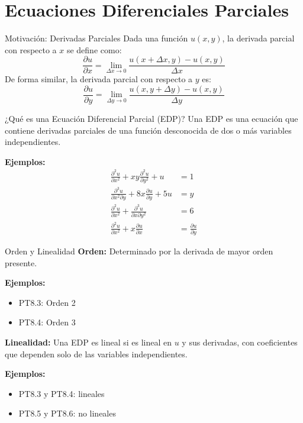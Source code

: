 \documentclass[main.tex]{subfiles}
\begin{document}
\section{Ecuaciones Diferenciales Parciales}

\begin{frame}{Motivación: Derivadas Parciales}
\small
Dada una función \( u(x, y) \), la derivada parcial con respecto a \( x \) se define como:
\[
\frac{\partial u}{\partial x} = \lim_{\Delta x \to 0} \frac{u(x + \Delta x, y) - u(x, y)}{\Delta x}
\]
De forma similar, la derivada parcial con respecto a \( y \) es:
\[
\frac{\partial u}{\partial y} = \lim_{\Delta y \to 0} \frac{u(x, y + \Delta y) - u(x, y)}{\Delta y}
\]
\end{frame}

\begin{frame}{¿Qué es una Ecuación Diferencial Parcial (EDP)?}
\small
Una EDP es una ecuación que contiene derivadas parciales de una función desconocida de dos o más variables independientes.

\textbf{Ejemplos:}
\begin{align*}
\frac{\partial^2 u}{\partial x^2} + x y \frac{\partial^2 u}{\partial y^2} + u &= 1 \\
\frac{\partial^3 u}{\partial x^2 \partial y} + 8x \frac{\partial u}{\partial y} + 5u &= y \\
\frac{\partial^2 u}{\partial x^2} + \frac{\partial^3 u}{\partial x \partial y^2} &= 6 \\
\frac{\partial^2 u}{\partial x^2} + x \frac{\partial u}{\partial x} &= \frac{\partial u}{\partial y}
\end{align*}
\end{frame}

\begin{frame}{Orden y Linealidad}
\small
\textbf{Orden:} Determinado por la derivada de mayor orden presente.

\textbf{Ejemplos:}
\begin{itemize}
  \item PT8.3: Orden 2
  \item PT8.4: Orden 3
\end{itemize}

\textbf{Linealidad:} Una EDP es lineal si es lineal en \( u \) y sus derivadas, con coeficientes que dependen solo de las variables independientes.

\textbf{Ejemplos:}
\begin{itemize}
  \item PT8.3 y PT8.4: lineales
  \item PT8.5 y PT8.6: no lineales
\end{itemize}
\end{frame}
\end{document}
